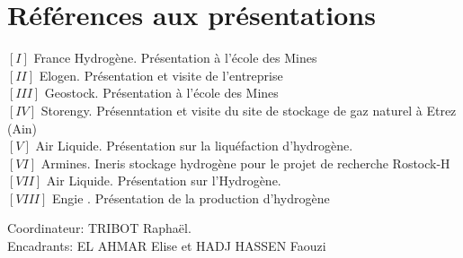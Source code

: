 \documentclass[11pt,french,a4paper]{article}
\begin{document}
  





\FloatBarrier

\newpage
{} %



 

\section*{Références aux présentations} 
\label{sec:presRef}

$[I]$   France Hydrogène. Présentation à l'école des Mines\\

$[II]$  Elogen. Présentation et visite de l'entreprise \\

$[III]$  Geostock. Présentation à l'école des Mines \\

$[IV]$   Storengy. Présenntation et visite du site de stockage de gaz naturel à Etrez (Ain)\\

$[V] $ Air Liquide. Présentation sur la liquéfaction d'hydrogène.  \\

$[VI]$  Armines. Ineris stockage hydrogène pour le projet de recherche Rostock-H \\

$[VII] $ Air Liquide. Présentation sur l’Hydrogène.  \\

$[VIII] $ Engie . Présentation de la production d'hydrogène \\


\begin{center}
Coordinateur: TRIBOT Raphaël. \\ Encadrants: EL AHMAR Elise et HADJ HASSEN Faouzi\\
\end{center}
\end{document}

